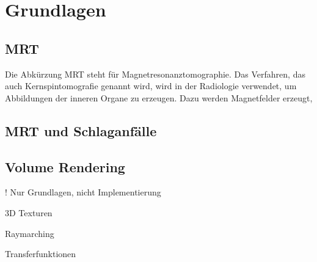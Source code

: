 
\chapter{Grundlagen}

\section{MRT}

Die Abkürzung MRT steht für Magnetresonanztomographie. Das Verfahren, das auch Kernspintomografie genannt wird, wird in der Radiologie verwendet, um Abbildungen der inneren Organe zu erzeugen. Dazu werden Magnetfelder erzeugt, 

\section{MRT und Schlaganfälle}

\section{Volume Rendering}

! Nur Grundlagen, nicht Implementierung

3D Texturen

Raymarching

Transferfunktionen







